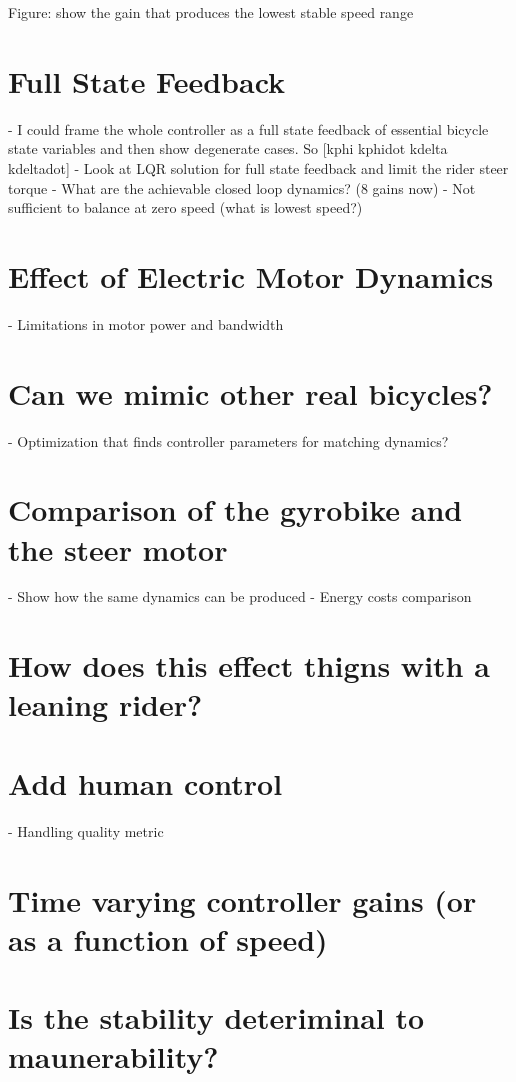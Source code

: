 \documentclass[12pt]{article}
\begin{document}
Figure: show the gain that produces the lowest stable speed range

\section{Full State Feedback}

- I could frame the whole controller as a full state feedback of essential
bicycle state variables and then show degenerate cases. So [kphi kphidot kdelta
kdeltadot]
- Look at LQR solution for full state feedback and limit the rider steer torque
- What are the achievable closed loop dynamics? (8 gains now)
- Not sufficient to balance at zero speed (what is lowest speed?)

\section{Effect of Electric Motor Dynamics}

- Limitations in motor power and bandwidth

\section{Can we mimic other real bicycles?}

- Optimization that finds controller parameters for matching dynamics?

\section{Comparison of the gyrobike and the steer motor}

- Show how the same dynamics can be produced
- Energy costs comparison

\section{How does this effect thigns with a leaning rider?}

\section{Add human control}

- Handling quality metric

\section{Time varying controller gains (or as a function of speed)}

\section{Is the stability deteriminal to maunerability?}
\end{document}
